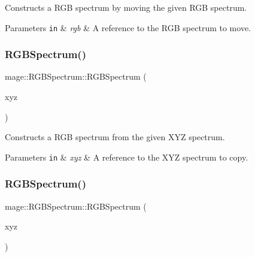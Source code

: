 Constructs a R\+GB spectrum by moving the given R\+GB spectrum.


\begin{DoxyParams}[1]{Parameters}
\mbox{\tt in}  & {\em rgb} & A reference to the R\+GB spectrum to move. \\
\hline
\end{DoxyParams}
\hypertarget{structmage_1_1_r_g_b_spectrum_a7c87ee10a81c55b1954915c1abea0cb9}{}\label{structmage_1_1_r_g_b_spectrum_a7c87ee10a81c55b1954915c1abea0cb9} 
\subsubsection{\texorpdfstring{R\+G\+B\+Spectrum()}{RGBSpectrum()}\hspace{0.1cm}{\footnotesize\ttfamily [5/8]}}
{\footnotesize\ttfamily mage\+::\+R\+G\+B\+Spectrum\+::\+R\+G\+B\+Spectrum (\begin{DoxyParamCaption}\item[{const \hyperlink{structmage_1_1_x_y_z_spectrum}{X\+Y\+Z\+Spectrum} \&}]{xyz }\end{DoxyParamCaption})\hspace{0.3cm}{\ttfamily [explicit]}}

Constructs a R\+GB spectrum from the given X\+YZ spectrum.


\begin{DoxyParams}[1]{Parameters}
\mbox{\tt in}  & {\em xyz} & A reference to the X\+YZ spectrum to copy. \\
\hline
\end{DoxyParams}
\hypertarget{structmage_1_1_r_g_b_spectrum_ad3307598d8156374483f66c0d3492b90}{}\label{structmage_1_1_r_g_b_spectrum_ad3307598d8156374483f66c0d3492b90} 
\subsubsection{\texorpdfstring{R\+G\+B\+Spectrum()}{RGBSpectrum()}\hspace{0.1cm}{\footnotesize\ttfamily [6/8]}}
{\footnotesize\ttfamily mage\+::\+R\+G\+B\+Spectrum\+::\+R\+G\+B\+Spectrum (\begin{DoxyParamCaption}\item[{\hyperlink{structmage_1_1_x_y_z_spectrum}{X\+Y\+Z\+Spectrum} \&\&}]{xyz }\end{DoxyParamCaption})\hspace{0.3cm}{\ttfamily [explicit]}}

